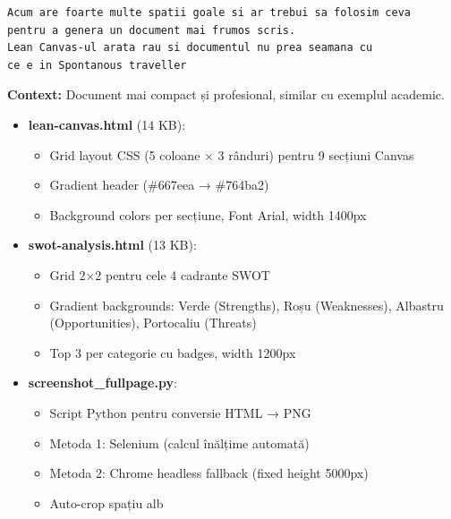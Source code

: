 \documentclass[11pt,a4paper]{article}
\begin{document}
\begin{tcolorbox}[colback=promptbackground,colframe=blue!75!black,title=Prompt Input]
\begin{verbatim}
Acum are foarte multe spatii goale si ar trebui sa folosim ceva
pentru a genera un document mai frumos scris.
Lean Canvas-ul arata rau si documentul nu prea seamana cu
ce e in Spontanous traveller
\end{verbatim}
\end{tcolorbox}

\textbf{Context:} Document mai compact și profesional, similar cu exemplul academic.

\begin{tcolorbox}[colback=outputbackground,colframe=green!75!black,title=Output Generat]
\begin{itemize}[leftmargin=*]
    \item \textbf{lean-canvas.html} (14 KB):
    \begin{itemize}
        \item Grid layout CSS (5 coloane × 3 rânduri) pentru 9 secțiuni Canvas
        \item Gradient header (\#667eea → \#764ba2)
        \item Background colors per secțiune, Font Arial, width 1400px
    \end{itemize}
    \item \textbf{swot-analysis.html} (13 KB):
    \begin{itemize}
        \item Grid 2×2 pentru cele 4 cadrante SWOT
        \item Gradient backgrounds: Verde (Strengths), Roșu (Weaknesses), Albastru (Opportunities), Portocaliu (Threats)
        \item Top 3 per categorie cu badges, width 1200px
    \end{itemize}
    \item \textbf{screenshot\_fullpage.py}:
    \begin{itemize}
        \item Script Python pentru conversie HTML → PNG
        \item Metoda 1: Selenium (calcul înălțime automată)
        \item Metoda 2: Chrome headless fallback (fixed height 5000px)
        \item Auto-crop spațiu alb
    \end{itemize}
\end{itemize}
\end{tcolorbox}
\end{document}
